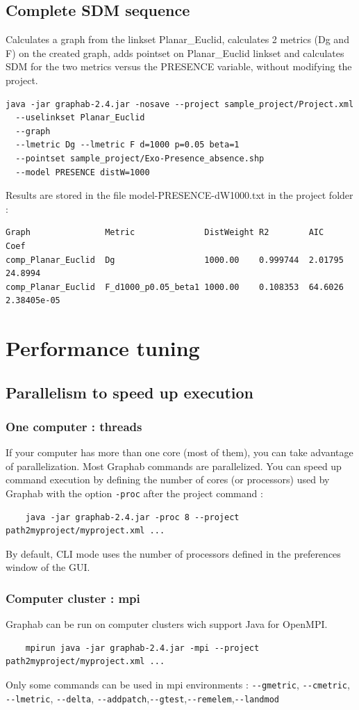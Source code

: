 \documentclass[a4paper,10pt]{report}
\begin{document}
\section{Complete SDM sequence}
Calculates a graph from the linkset Planar\_Euclid, calculates 2 metrics (Dg and F) on the created graph, adds pointset on Planar\_Euclid linkset 
and calculates SDM for the two metrics versus the PRESENCE variable, without modifying the project.
\begin{Verbatim}
java -jar graphab-2.4.jar -nosave --project sample_project/Project.xml  
  --uselinkset Planar_Euclid 
  --graph 
  --lmetric Dg --lmetric F d=1000 p=0.05 beta=1 
  --pointset sample_project/Exo-Presence_absence.shp 
  --model PRESENCE distW=1000
\end{Verbatim}
Results are stored in the file model-PRESENCE-dW1000.txt in the project folder :
\begin{Verbatim}
Graph               Metric              DistWeight R2        AIC      Coef
comp_Planar_Euclid  Dg                  1000.00    0.999744  2.01795  24.8994
comp_Planar_Euclid  F_d1000_p0.05_beta1 1000.00    0.108353  64.6026  2.38405e-05
\end{Verbatim}

\chapter{Performance tuning}
\section{Parallelism to speed up execution}
\subsection{One computer : threads}
If your computer has more than one core (most of them), you can take advantage of parallelization. 
Most Graphab commands are parallelized. You can speed up command execution by defining the number
of cores (or processors) used by Graphab with the option \verb|-proc| after the project command :
\begin{Verbatim}
	java -jar graphab-2.4.jar -proc 8 --project path2myproject/myproject.xml ...
\end{Verbatim}
By default, CLI mode uses the number of processors defined in the preferences window of the GUI.
\subsection{Computer cluster : mpi}
Graphab can be run on computer clusters wich support Java for OpenMPI.
\begin{Verbatim}
	mpirun java -jar graphab-2.4.jar -mpi --project path2myproject/myproject.xml ...
\end{Verbatim}
Only some commands can be used in mpi environments : \verb|--gmetric|, \verb|--cmetric|, \verb|--lmetric|, \verb|--delta|, \verb|--addpatch|,\verb|--gtest|,\verb|--remelem|,\verb|--landmod|
\end{document}
